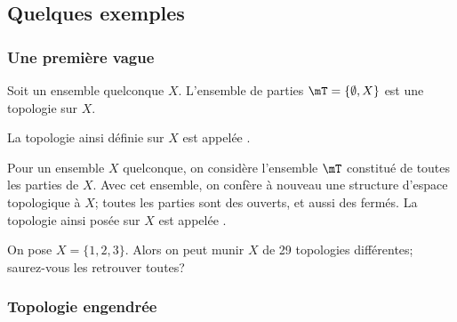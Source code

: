 \subsection{Quelques exemples}

\subsubsection{Une première vague}

\begin{example}\label{DefTopologieGrossiere}
	Soit un ensemble quelconque \( X\). L'ensemble de parties \( \mT=\{ \emptyset, X \}\) est une topologie sur \( X\).

	La topologie ainsi définie sur \(X \) est appelée .
\end{example}

\begin{example}\label{DefTopologieDiscrete}
	Pour un ensemble \( X \) quelconque, on considère l'ensemble \( \mT \) constitué de toutes les parties de \( X \). Avec cet ensemble, on confère à nouveau une structure d'espace topologique à \(X \); toutes les parties sont des ouverts, et aussi des fermés. La topologie ainsi posée sur \(X \) est appelée .
\end{example}

\begin{example}       \label{EXooLAOSooJtjJnu}
	On pose \( X = \{1, 2, 3\} \). Alors on peut munir \( X \) de 29 topologies différentes\cite{BIBooSLBZooRYtdIi}; saurez-vous les retrouver toutes?
\end{example}

\subsubsection{Topologie engendrée}

